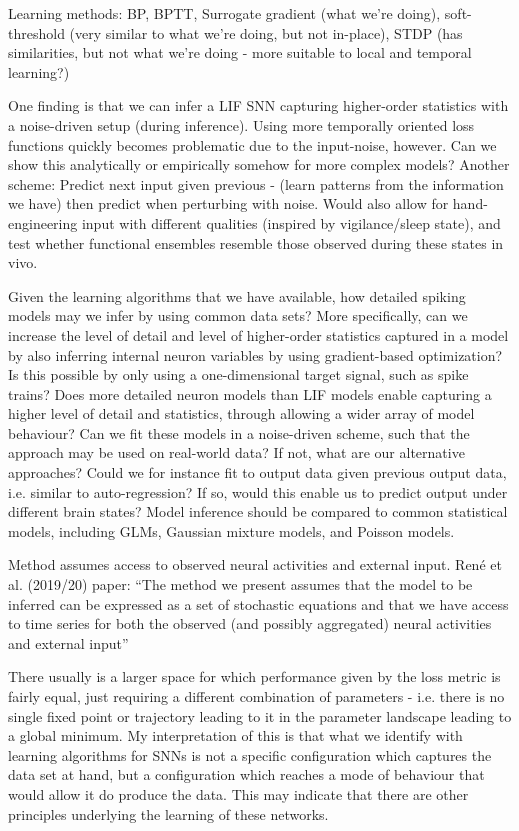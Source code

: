\documentclass[mphil,deptreport,ianc]{infthesis} %
\begin{document}
Learning methods:
BP, BPTT, Surrogate gradient (what we’re doing), soft-threshold (very similar to what we’re doing, but not in-place), STDP (has similarities, but not what we’re doing - more suitable to local and temporal learning?)

One finding is that we can infer a LIF SNN capturing higher-order statistics with a noise-driven setup (during inference). Using more temporally oriented loss functions quickly becomes problematic due to the input-noise, however. Can we show this analytically or empirically somehow for more complex models?
Another scheme: Predict next input given previous - (learn patterns from the information we have) then predict when perturbing with noise. Would also allow for hand-engineering input with different qualities (inspired by vigilance/sleep state), and test whether functional ensembles resemble those observed during these states in vivo.

Given the learning algorithms that we have available, how detailed spiking models may we infer by using common data sets? More specifically, can we increase the level of detail and level of higher-order statistics captured in a model by also inferring internal neuron variables by using gradient-based optimization? Is this possible by only using a one-dimensional target signal, such as spike trains? Does more detailed neuron models than LIF models enable capturing a higher level of detail and statistics, through allowing a wider array of model behaviour? Can we fit these models in a noise-driven scheme, such that the approach may be used on real-world data? If not, what are our alternative approaches? Could we for instance fit to output data given previous output data, i.e. similar to auto-regression? If so, would this enable us to predict output under different brain states?
Model inference should be compared to common statistical models, including GLMs, Gaussian mixture models, and Poisson models.


Method assumes access to observed neural activities and external input.
René et al. (2019/20) paper:
“The method we present assumes that the model to be inferred can be expressed as a
set of stochastic equations and that we have access to time series for both the observed (and possibly aggregated) neural activities and external input”

There usually is a larger space for which performance given by the loss metric is fairly equal, just requiring a different combination of parameters - i.e. there is no single fixed point or trajectory leading to it in the parameter landscape leading to a global minimum.
My interpretation of this is that what we identify with learning algorithms for SNNs is not a specific configuration which captures the data set at hand, but a configuration which reaches a mode of behaviour that would allow it do produce the data.
This may indicate that there are other principles underlying the learning of these networks.
\end{document}
